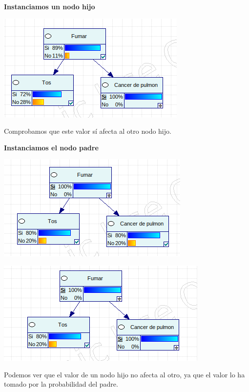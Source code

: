 \documentclass{article}
\begin{document}
\textbf{Instanciamos un nodo hijo}

\begin{center}
\includegraphics[scale=0.5]{1a2.png}
\end{center}

Comprobamos que este valor sí afecta al otro nodo hijo.

\newpage

\textbf{Instanciamos el nodo padre}

\begin{center}
\includegraphics[scale=0.5]{1a3.png}
\end{center}

\begin{center}
\includegraphics[scale=0.5]{1a4.png}
\end{center}

Podemos ver que el valor de un nodo hijo no afecta al otro, ya que el valor lo ha tomado por la probabilidad del padre.
\end{document}
